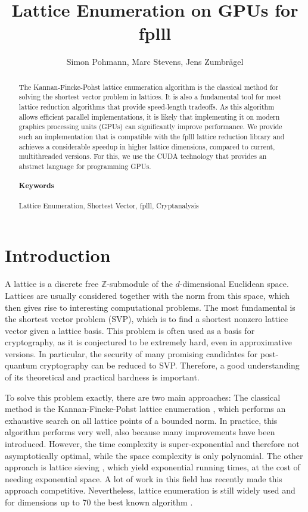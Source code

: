 \documentclass{scrartcl}
\title{Lattice Enumeration on GPUs for fplll}
\author{Simon Pohmann, Marc Stevens, Jens Zumbrägel}
\newcommand{\Z}{\mathbb{Z}}
\begin{document}
    \maketitle
    
    \begin{abstract}
    The Kannan-Fincke-Pohst lattice enumeration algorithm is the classical method for solving the shortest vector problem in lattices. It is also a fundamental tool for most lattice reduction algorithms that provide speed-length tradeoffs. 
    As this algorithm allows efficient parallel implementations, it is likely that implementing it on modern graphics processing units (GPUs) can significantly improve performance. 
    We provide such an implementation that is compatible with the fplll lattice reduction library \cite{fplll} and achieves a considerable speedup in higher lattice dimensions, compared to current, multithreaded versions.
    For this, we use the CUDA technology that provides an abstract language for programming GPUs.
    
    \paragraph{Keywords} Lattice Enumeration, Shortest Vector, fplll, Cryptanalysis
    \end{abstract}

    \section{Introduction}

    A lattice is a discrete free $\Z$-submodule of the $d$-dimensional Euclidean space. Lattices are usually considered together with the norm from this space, which then gives rise to interesting computational problems.
    The most fundamental is the shortest vector problem (SVP), which is to find a shortest nonzero lattice vector given a lattice basis. 
    This problem is often used as a basis for cryptography, as it is conjectured to be extremely hard, even in approximative versions.
    In particular, the security of many promising candidates for post-quantum cryptography can be reduced to SVP. 
    Therefore, a good understanding of its theoretical and practical hardness is important.

    To solve this problem exactly, there are two main approaches:
    The classical method is the Kannan-Fincke-Pohst lattice enumeration \cite{enum1, enum}, which performs an exhaustive search on all lattice points of a bounded norm. 
    In practice, this algorithm performs very well, also because many improvements have been introduced.
    However, the time complexity is super-exponential and therefore not asymptotically optimal, while the space complexity is only polynomial.
    The other approach is lattice sieving \cite{sieve}, which yield exponential running times, at the cost of needing exponential space. 
    A lot of work in this field has recently made this approach competitive.
    Nevertheless, lattice enumeration is still widely used and for dimensions up to 70 the best known algorithm \cite{g6k}.
\end{document}
